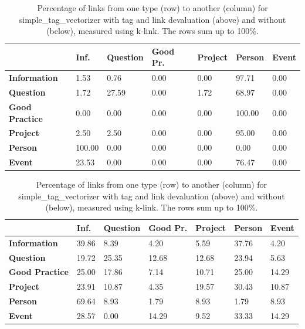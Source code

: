 \begin{table}
\begin{tabular}{| l | l | l | l | l | l | l | }
\hline
 & {\bf Inf. }& {\bf Question }& {\bf Good Pr.} & {\bf Project }&{\bf Person }& {\bf Event}  \\
\hline
{\bf Information} & 1.53 &  0.76  &  0.00  &  0.00  & 97.71 & 0.00  \\
{\bf Question} & 1.72 &  27.59  &  0.00  &  1.72  & 68.97 & 0.00 \\
{\bf Good Practice} & 0.00 &  0.00  &  0.00  &  0.00  & 100.00 & 0.00 \\
{\bf Project }&2.50 &  2.50  &  0.00  &  0.00  & 95.00 & 0.00 \\
{\bf Person} & 100.00 &  0.00  &  0.00  &  0.00  & 0.00 & 0.00 \\
{\bf Event }& 23.53 &  0.00  &  0.00  &  0.00  & 76.47 & 0.00 \\
\hline
\end{tabular}

\hspace{10em}

\begin{tabular}{| l | l | l | l | l | l | l | }
\hline
 & {\bf Inf. }& {\bf Question }& {\bf Good Pr.} & {\bf Project }&{\bf Person }& {\bf Event} \\
\hline
{\bf Information} &  39.86 & 8.39 &4.20 &5.59 &37.76 &4.20\\
{\bf Question} & 19.72 &25.35 &12.68 &12.68 &23.94 &5.63\\
{\bf Good Practice} & 25.00 & 17.86 & 7.14 & 10.71 & 25.00 & 14.29 \\
{\bf Project } & 23.91 & 10.87 & 4.35 & 19.57 & 30.43 & 10.87 \\
{\bf Person} & 69.64 & 8.93 & 1.79 & 8.93 & 1.79 & 8.93 \\
{\bf Event }& 28.57 & 0.00 & 14.29 & 9.52 & 33.33 & 14.29\\
\hline
\end{tabular}

\caption{Percentage of links from one type (row) to another (column) for simple\_tag\_vectorizer with tag and link devaluation (above) and without (below), measured using k-link. The rows sum up to 100\%.}
\label{bayes_table1}
\end{table}

